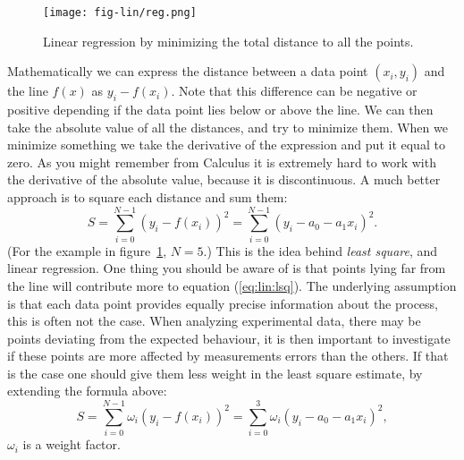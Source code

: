 \documentclass[graybox,sectrefs,envcountresetchap,open=right,final]{svmonodo}
\begin{document}
\begin{figure}[!ht]  %
  \centerline{\texttt{[image: fig-lin/reg.png]}}
  \caption{
  Linear regression by minimizing the total distance to all the points. \label{fig:lin:reg}
  }
\end{figure}

Mathematically we can express the distance between a data point $(x_i,y_i)$ and the line $f(x)$ as $y_i-f(x_i)$. Note that this difference can be negative or positive depending if the data point lies below or above the line. We can then take the absolute value of all the distances, and try to minimize them. When we minimize something we take the derivative of the expression and put it equal to zero.  As you might remember from Calculus it is extremely hard to work with the derivative of the absolute value, because it is discontinuous. A much better approach is to square each distance and sum them:
\begin{equation}
S=\sum_{i=0}^{N-1}(y_i-f(x_i))^2=\sum_{i=0}^{N-1}(y_i-a_0-a_1x_i)^2.
\label{eq:lin:lsq}
\end{equation}
(For the example in figure~\ref{fig:lin:reg}, $N=5$.) This is the idea behind \emph{least square}, and linear regression. One thing you should be aware of is that points lying far from the line will contribute more to equation (\ref{eq:lin:lsq}). The underlying assumption is that each data point provides equally precise information about the process, this is often not the case. When analyzing experimental data, there may be points deviating from the expected behaviour, it is then important to investigate if these points are more affected by measurements errors than the others. If that is the case one should give them less weight in the least square estimate, by extending the formula above:
\begin{equation}
S=\sum_{i=0}^{N-1}\omega_i(y_i-f(x_i))^2=\sum_{i=0}^3\omega_i(y_i-a_0-a_1x_i)^2,
\label{eq:lin:lsqm}
\end{equation}
$\omega_i$ is a weight factor.
\end{document}
